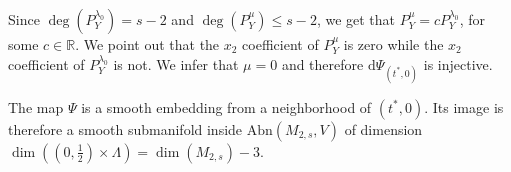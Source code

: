 \documentclass[a4paper,11pt,reqno]{amsart}
\theoremstyle{plain}
\theoremstyle{definition}
\newcommand{\R}{\mathbb R}
\newcommand{\de}{\mathrm{d}}
\newcommand{\abn}{\mathrm{Abn}}
\begin{document}
Since $\deg(P^{\lambda_0}_Y)=s-2$ and $\deg(P^\mu_Y)\le s-2$, we get that $P^\mu_Y = c P^{\lambda_0}_Y$, for some $c \in \R$. We point out that the $x_2$ coefficient of $P^\mu_Y$ is zero while the $x_2$ coefficient of $P^{\lambda_0}_Y$ is not. We infer that $\mu=0$ and therefore $\de\Psi_{(t^*,0)}$ is injective. 

The map $\Psi$ is a smooth embedding from a neighborhood of $(t^*,0)$.
Its image is therefore a smooth submanifold inside
$\abn(M_{2,s},V)$ of dimension $\dim((0,\tfrac{1}{2})\times \Lambda) = \dim(M_{2,s})-3$. \hfill \qedsymbol

	

		
\end{document}
